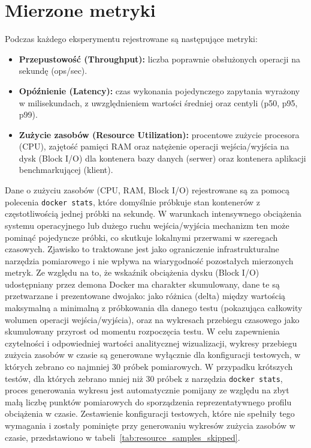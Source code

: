 \section{Mierzone metryki}
Podczas każdego eksperymentu rejestrowane są następujące metryki:
\begin{itemize}
    \item \textbf{Przepustowość (Throughput):} liczba poprawnie obsłużonych operacji na sekundę (ops/sec).
    \item \textbf{Opóźnienie (Latency):} czas wykonania pojedynczego zapytania wyrażony w milisekundach, z uwzględnieniem wartości średniej oraz centyli (p50, p95, p99).
    \item \textbf{Zużycie zasobów (Resource Utilization):} procentowe zużycie procesora (CPU), zajętość pamięci RAM oraz natężenie operacji wejścia/wyjścia na dysk (Block I/O) dla kontenera bazy danych (serwer) oraz kontenera aplikacji benchmarkującej (klient).
\end{itemize}

Dane o zużyciu zasobów (CPU, RAM, Block I/O) rejestrowane są za pomocą polecenia \texttt{docker stats}, które domyślnie próbkuje stan kontenerów z częstotliwością jednej próbki na sekundę. W warunkach intensywnego obciążenia systemu operacyjnego lub dużego ruchu wejścia/wyjścia mechanizm ten może pominąć pojedyncze próbki, co skutkuje lokalnymi przerwami w szeregach czasowych. Zjawisko to traktowane jest jako ograniczenie infrastrukturalne narzędzia pomiarowego i nie wpływa na wiarygodność pozostałych mierzonych metryk. Ze względu na to, że wskaźnik obciążenia dysku (Block I/O) udostępniany przez demona Docker ma charakter skumulowany, dane te są przetwarzane i prezentowane dwojako: jako różnica (delta) między wartością maksymalną a minimalną z próbkowania dla danego testu (pokazująca całkowity wolumen operacji wejścia/wyjścia), oraz na wykresach przebiegu czasowego jako skumulowany przyrost od momentu rozpoczęcia testu. W celu zapewnienia czytelności i odpowiedniej wartości analitycznej wizualizacji, wykresy przebiegu zużycia zasobów w czasie są generowane wyłącznie dla konfiguracji testowych, w których zebrano co najmniej 30 próbek pomiarowych. W przypadku krótszych testów, dla których zebrano mniej niż 30 próbek z narzędzia \texttt{docker stats}, proces generowania wykresu jest automatycznie pomijany ze względu na zbyt małą liczbę punktów pomiarowych do sporządzenia reprezentatywnego profilu obciążenia w czasie. Zestawienie konfiguracji testowych, które nie spełniły tego wymagania i zostały pominięte przy generowaniu wykresów zużycia zasobów w czasie, przedstawiono w tabeli~\ref{tab:resource_samples_skipped}.

